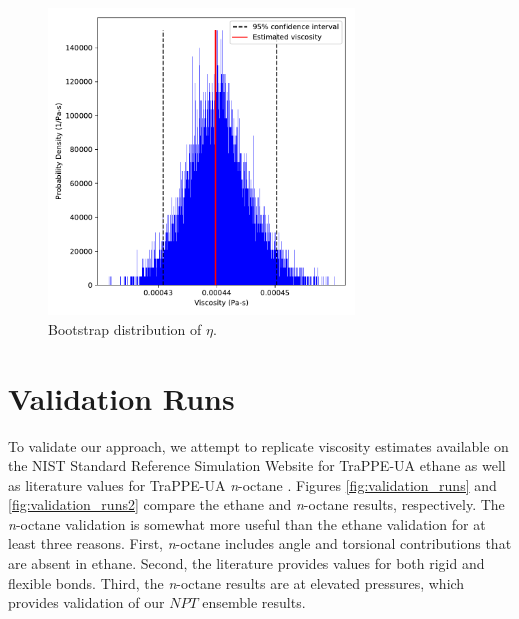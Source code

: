 \documentclass[preprint,review,11pt]{elsarticle}
\begin{document}
	\begin{figure}[htb!]
		\centering
		\includegraphics[width=3.2in]{GK_bootstraps_MCMC_rho0.pdf}
		\caption{Bootstrap distribution of $\eta$.}
		\label{fig:bootstraps}
	\end{figure} 

%	
	

    \clearpage
	\newpage

	\section{Validation Runs} \label{Validation Runs}
	
	To validate our approach, we attempt to replicate viscosity estimates available on the NIST Standard Reference Simulation Website \cite{NIST_SRSW} for TraPPE-UA ethane as well as literature values for TraPPE-UA \textit{n}-octane \cite{Kioupis2000,Nieto2006}. Figures \ref{fig:validation_runs} and \ref{fig:validation_runs2} compare the ethane and \textit{n}-octane results, respectively. The \textit{n}-octane validation is somewhat more useful than the ethane validation for at least three reasons. First, \textit{n}-octane includes angle and torsional contributions that are absent in ethane. Second, the literature provides values for both rigid and flexible bonds. Third, the \textit{n}-octane results are at elevated pressures, which provides validation of our $NPT$ ensemble results. 
	
\end{document}
